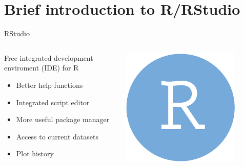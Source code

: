 \documentclass[aspectratio=169]{beamer}\usepackage[]{graphicx}\usepackage[]{color}
\begin{document}
\section{Brief introduction to R/RStudio}
\begin{frame}{RStudio}
\begin{columns}
	\begin{column}{0.70\textwidth}
  Free integrated development enviroment (IDE) for R
  \begin{itemize}
    \item Better help functions
    \item Integrated script editor
  	\item More useful package manager
  	\item Access to current datasets
  	\item Plot history
  \end{itemize}
	\end{column}
	\begin{column}{0.3\textwidth}
		\begin{center}
			\includegraphics[width=0.8\textwidth]{./images/rstudio_icon.png}
		\end{center}
	\end{column}
\end{columns}
\end{frame}
\end{document}
